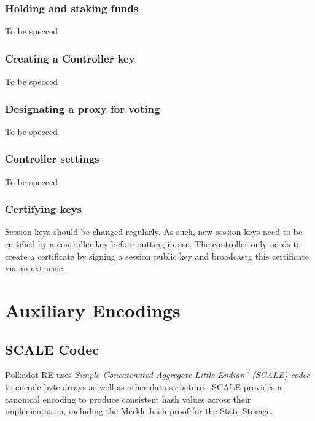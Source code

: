 \documentclass{book}
\newcommand{\tmem}[1]{{\em #1\/}}
\newcommand{\tmtextit}[1]{{\itshape{#1}}}
\providecommand{\tmem}[1]{\tmtextit{#1}}
\providecommand{\tmtextit}[1]{\tmtextit{#1}}
\begin{document}
\subsection{Holding and staking funds}\label{sect-staking-funds}

To be specced

\subsection{Creating a Controller key}\label{sect-creating-controller-key}

To be specced

\subsection{Designating a proxy for voting}\label{sect-designating-proxy}

To be specced

\subsection{Controller settings}\label{sect-controller-settings}

To be specced

\subsection{Certifying keys}\label{sect-certifying-keys}

Session keys should be changed regularly. As such, new session keys need to be
certified by a controller key before putting in use. The controller only needs
to create a certificate by signing a session public key and broadcastg this
certificate via an extrinsic. {}\chapter{Auxiliary Encodings}\label{sect-encoding}

\section{SCALE Codec}\label{sect-scale-codec}

Polkadot RE uses {\tmem{Simple Concatenated Aggregate Little-Endian'' (SCALE)
codec}} to encode byte arrays as well as other data structures. SCALE provides
a canonical encoding to produce consistent hash values across their
implementation, including the Merkle hash proof for the State Storage.
\end{document}
